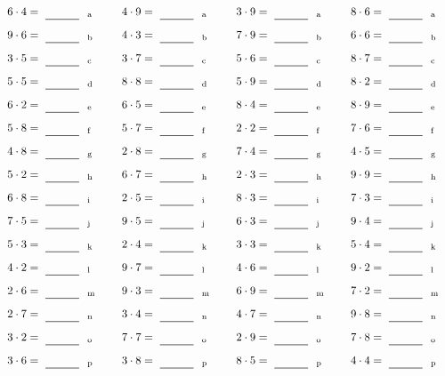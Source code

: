 \documentclass
[
  draft    = true,
  fontsize = 11pt,
  parskip  = half-
]
{scrartcl}
\begin{document}
\par\vfill\par
\begin{align*}
    \pline{6\cdot4}&=\rline{a}
  & \pline{4\cdot9}&=\rline{a}
  & \pline{3\cdot9}&=\rline{a}
  & \pline{8\cdot6}&=\rline{a} \\[1ex]
    \pline{9\cdot6}&=\rline{b}
  & \pline{4\cdot3}&=\rline{b}
  & \pline{7\cdot9}&=\rline{b}
  & \pline{6\cdot6}&=\rline{b} \\[1ex]
    \pline{3\cdot5}&=\rline{c}
  & \pline{3\cdot7}&=\rline{c}
  & \pline{5\cdot6}&=\rline{c}
  & \pline{8\cdot7}&=\rline{c} \\[1ex]
    \pline{5\cdot5}&=\rline{d}
  & \pline{8\cdot8}&=\rline{d}
  & \pline{5\cdot9}&=\rline{d}
  & \pline{8\cdot2}&=\rline{d} \\[1ex]
    \pline{6\cdot2}&=\rline{e}
  & \pline{6\cdot5}&=\rline{e}
  & \pline{8\cdot4}&=\rline{e}
  & \pline{8\cdot9}&=\rline{e} \\[1ex]
    \pline{5\cdot8}&=\rline{f}
  & \pline{5\cdot7}&=\rline{f}
  & \pline{2\cdot2}&=\rline{f}
  & \pline{7\cdot6}&=\rline{f} \\[1ex]
    \pline{4\cdot8}&=\rline{g}
  & \pline{2\cdot8}&=\rline{g}
  & \pline{7\cdot4}&=\rline{g}
  & \pline{4\cdot5}&=\rline{g} \\[1ex]
    \pline{5\cdot2}&=\rline{h}
  & \pline{6\cdot7}&=\rline{h}
  & \pline{2\cdot3}&=\rline{h}
  & \pline{9\cdot9}&=\rline{h} \\[1ex]
    \pline{6\cdot8}&=\rline{i}
  & \pline{2\cdot5}&=\rline{i}
  & \pline{8\cdot3}&=\rline{i}
  & \pline{7\cdot3}&=\rline{i} \\[1ex]
    \pline{7\cdot5}&=\rline{j}
  & \pline{9\cdot5}&=\rline{j}
  & \pline{6\cdot3}&=\rline{j}
  & \pline{9\cdot4}&=\rline{j} \\[1ex]
    \pline{5\cdot3}&=\rline{k}
  & \pline{2\cdot4}&=\rline{k}
  & \pline{3\cdot3}&=\rline{k}
  & \pline{5\cdot4}&=\rline{k} \\[1ex]
    \pline{4\cdot2}&=\rline{l}
  & \pline{9\cdot7}&=\rline{l}
  & \pline{4\cdot6}&=\rline{l}
  & \pline{9\cdot2}&=\rline{l} \\[1ex]
    \pline{2\cdot6}&=\rline{m}
  & \pline{9\cdot3}&=\rline{m}
  & \pline{6\cdot9}&=\rline{m}
  & \pline{7\cdot2}&=\rline{m} \\[1ex]
    \pline{2\cdot7}&=\rline{n}
  & \pline{3\cdot4}&=\rline{n}
  & \pline{4\cdot7}&=\rline{n}
  & \pline{9\cdot8}&=\rline{n} \\[1ex]
    \pline{3\cdot2}&=\rline{o}
  & \pline{7\cdot7}&=\rline{o}
  & \pline{2\cdot9}&=\rline{o}
  & \pline{7\cdot8}&=\rline{o} \\[1ex]
    \pline{3\cdot6}&=\rline{p}
  & \pline{3\cdot8}&=\rline{p}
  & \pline{8\cdot5}&=\rline{p}
  & \pline{4\cdot4}&=\rline{p}
\end{align*}
\end{document}
